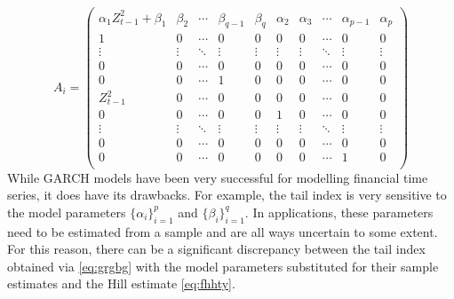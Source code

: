 \[
A_i =
\begin{pmatrix}
  \alpha_1 Z_{t-1}^2 + \beta_1 & \beta_2 & \cdots &
  \beta_{q-1} & \beta_q & \alpha_2 & \alpha_3 &
  \cdots & \alpha_{p-1} & \alpha_p\\
  1 & 0 & \cdots & 
  0 & 0 & 0 & 0 & \cdots & 0 & 0 \\
  \vdots & \vdots & \ddots & 
  \vdots & \vdots & \vdots & \vdots &
  \ddots & \vdots & \vdots \\
  0 & 0 & \cdots &
  0 & 0 & 0 & 0 & \cdots & 0 & 0 \\
  0 & 0 & \cdots &
  1 & 0 & 0 & 0 & \cdots & 0 & 0 \\
  Z_{t-1}^2 & 0 & \cdots &
  0 & 0 & 0 & 0 & \cdots & 0 & 0 \\
  0 & 0 & \cdots &
  0 & 0 & 1 & 0 & \cdots & 0 & 0 \\
  \vdots & \vdots & \ddots &
  \vdots & \vdots & \vdots & \vdots &
  \ddots & \vdots & \vdots \\
  0 & 0 & \cdots &
  0 & 0 & 0 & 0 & \cdots & 0 & 0 \\    
  0 & 0 & \cdots &
  0 & 0 & 0 & 0 & \cdots & 1 & 0 \\    
\end{pmatrix}
\]
While GARCH models have been very successful for modelling financial
time series, it does have its drawbacks. For example, the tail
index is very sensitive to the model parameters $\{\alpha_i\}_{i=1}^p$ and
$\{\beta_i\}_{i=1}^q$. In applications, these parameters need to be
estimated from a sample and are all ways uncertain to some extent. For
this reason, there can be a significant discrepancy between the tail
index obtained via \eqref{eq:grgbg} with the model parameters
substituted for their sample estimates and the Hill estimate
\eqref{eq:fhhty}.

